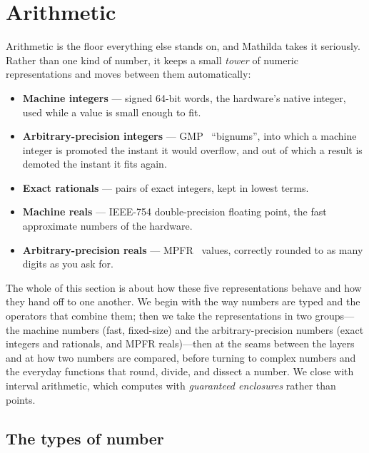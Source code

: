 \section{Arithmetic}
\label{sec:arithmetic}

Arithmetic is the floor everything else stands on, and Mathilda takes it seriously.
Rather than one kind of number, it keeps a small \emph{tower} of numeric
representations and moves between them automatically:

\begin{itemize}
  \item \textbf{Machine integers} — signed 64-bit words, the hardware's native
        integer, used while a value is small enough to fit.
  \item \textbf{Arbitrary-precision integers} — GMP~\cite{gmp} ``bignums'', into
        which a machine integer is promoted the instant it would overflow, and out
        of which a result is demoted the instant it fits again.
  \item \textbf{Exact rationals} — pairs of exact integers, kept in lowest terms.
  \item \textbf{Machine reals} — IEEE-754 double-precision floating point, the fast
        approximate numbers of the hardware.
  \item \textbf{Arbitrary-precision reals} — MPFR~\cite{mpfr} values, correctly
        rounded to as many digits as you ask for.
\end{itemize}

The whole of this section is about how these five representations behave and how
they hand off to one another. We begin with the way numbers are typed and the
operators that combine them; then we take the representations in two groups---the
machine numbers (fast, fixed-size) and the arbitrary-precision numbers (exact integers
and rationals, and MPFR reals)---then at the seams between the layers and at how two
numbers are compared, before turning to complex numbers and the everyday
functions that round, divide, and dissect a number. We close with interval arithmetic,
which computes with \emph{guaranteed enclosures}
rather than points.

\subsection{The types of number}
\label{ssec:number-types}

